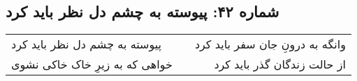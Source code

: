 \begin{center}
\section*{شماره ۴۲: پیوسته به چشم دل نظر باید کرد}
\label{sec:042}
\begin{longtable}{l p{0.5cm} r}
پیوسته به چشم دل نظر باید کرد
&&
وانگه به درونِ جان سفر باید کرد
\\
خواهی که به زیرِ خاک خاکی نشوی
&&
از حالت زندگان گذر باید کرد
\\
\end{longtable}
\end{center}
